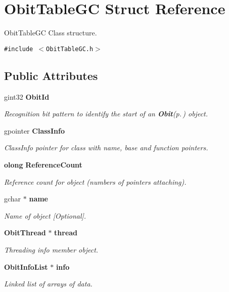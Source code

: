 \section{Obit\-Table\-GC Struct Reference}
\label{structObitTableGC}
Obit\-Table\-GC Class structure.  


{\tt \#include $<$Obit\-Table\-GC.h$>$}

\subsection*{Public Attributes}
\begin{CompactItemize}
\item 
gint32 {\bf Obit\-Id}
\begin{CompactList}\small\item\em Recognition bit pattern to identify the start of an {\bf Obit}{\rm (p.\,\pageref{structObit})} object. \item\end{CompactList}\item 
gpointer {\bf Class\-Info}
\begin{CompactList}\small\item\em Class\-Info pointer for class with name, base and function pointers. \item\end{CompactList}\item 
{\bf olong} {\bf Reference\-Count}
\begin{CompactList}\small\item\em Reference count for object (numbers of pointers attaching). \item\end{CompactList}\item 
gchar $\ast$ {\bf name}
\begin{CompactList}\small\item\em Name of object [Optional]. \item\end{CompactList}\item 
{\bf Obit\-Thread} $\ast$ {\bf thread}
\begin{CompactList}\small\item\em Threading info member object. \item\end{CompactList}\item 
{\bf Obit\-Info\-List} $\ast$ {\bf info}
\begin{CompactList}\small\item\em Linked list of arrays of data. \item\end{CompactList}\item 

\end{CompactItemize}
